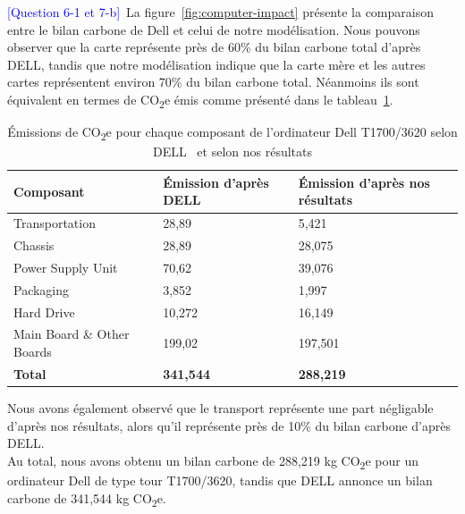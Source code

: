 \documentclass[12pt,a4paper]{paper}
\begin{document}
\textcolor{blue}{[Question 6-1 et 7-b]}~La figure~\ref{fig:computer-impact} présente la comparaison entre le bilan carbone de Dell et celui de notre modélisation. Nous pouvons observer que la carte représente près de 60\% du bilan carbone total d'après DELL, tandis que notre modélisation indique que la carte mère et les autres cartes représentent environ 70\% du bilan carbone total. Néanmoins ils sont équivalent en termes de CO\textsubscript{2}e émis comme présenté dans le tableau~\ref{tab:emissions}.\\
\begin{table}[H]
    \centering
    \begin{tabular}{|p{2.5cm}|p{2.4cm}|p{2.4cm}|}
    \hline
    \textbf{Composant} & \textbf{Émission d'après DELL} & \textbf{Émission d'après nos résultats} \\
    \hline
    Transportation & 28{,}89 & 5{,}421 \\ \hline
    Chassis & 28{,}89 & 28{,}075 \\ \hline
    Power Supply Unit & 70{,}62 & 39{,}076 \\ \hline
    Packaging & 3{,}852 & 1{,}997 \\ \hline
    Hard Drive & 10{,}272 & 16{,}149 \\ \hline
    Main Board \& Other Boards & 199{,}02 & 197{,}501 \\
    \hline
    \textbf{Total} & \textbf{341{,}544} & \textbf{288{,}219} \\
    \hline
    \end{tabular}
    \caption{Émissions de CO\textsubscript{2}e pour chaque composant de l'ordinateur Dell T1700/3620 selon DELL~\cite{Dell2018} et selon nos résultats}
    \label{tab:emissions}
\end{table}
Nous avons également observé que le transport représente une part négligable d'après nos résultats, alors qu'il représente près de 10\% du bilan carbone d'après DELL. \\
Au total, nous avons obtenu un bilan carbone de 288,219 kg CO\textsubscript{2}e pour un ordinateur Dell de type tour T1700/3620, tandis que DELL annonce un bilan carbone de 341,544 kg CO\textsubscript{2}e.
\end{document}
